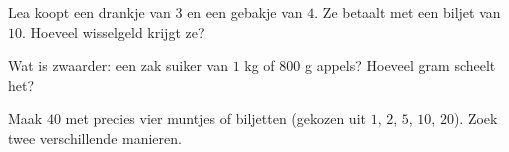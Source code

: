 \begin{exercise}[$\star$]\label{exo:g2:measure:8}
Lea koopt een drankje van $3$ en een gebakje van $4$. Ze betaalt met
een biljet van $10$. Hoeveel wisselgeld krijgt ze?
\end{exercise}

\begin{exercise}[$\star$]\label{exo:g2:measure:9}
Wat is zwaarder: een zak suiker van $1$ kg of $800$ g appels? Hoeveel
gram scheelt het?
\end{exercise}

\begin{exercise}[$\star\star$]\label{exo:g2:measure:10}
Maak $40$ met precies vier muntjes of biljetten (gekozen uit $1$, $2$,
$5$, $10$, $20$). Zoek twee verschillende manieren.
\end{exercise}
